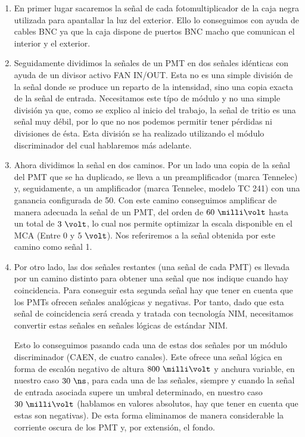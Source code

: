 \begin{enumerate} 
\item{} En primer lugar sacaremos la señal de cada fotomultiplicador de la caja negra utilizada para apantallar la luz del exterior. Ello lo conseguimos con ayuda de cables BNC  ya que la caja dispone de puertos BNC macho que comunican el interior y el exterior.

\item {} Seguidamente dividimos la señales de un PMT en dos señales idénticas con ayuda de un divisor activo FAN IN/OUT. Esta no es una simple división de la señal donde se produce un reparto de la intensidad, sino una copia exacta de la señal de entrada. Necesitamos este típo de módulo y no una simple división ya que, como se explico al inicio del trabajo, la señal de tritio es una señal muy débil, por lo que no nos podemos permitir tener pérdidas ni divisiones de ésta. Esta división se ha realizado utilizando el módulo discriminador del cual hablaremos más adelante.

\item {} Ahora dividimos la señal en dos caminos. Por un lado una copia de la señal del PMT que se ha duplicado, se lleva a un preamplificador (marca Tennelec) y, seguidamente, a un amplificador (marca Tennelec, modelo TC 241) con una ganancia configurada de 50. Con este camino conseguimos amplificar de manera adecuada la señal de un PMT, del orden de $60~\milli\volt$ hasta un total de $3~\volt$, lo cual nos permite optimizar la escala disponible en el MCA (Entre 0 y $5~\volt$). Nos referiremos a la señal obtenida por este camino como señal 1.

\item{} Por otro lado, las dos señales restantes (una señal de cada PMT) es llevada por un camino distinto para obtener una señal que nos indique cuando hay coincidencia. Para conseguir esta segunda señal hay que tener en cuenta que los PMTs ofrecen señales analógicas y negativas. Por tanto, dado que esta señal de coincidencia será creada y tratada con tecnología NIM, necesitamos convertir estas señales en señales lógicas de estándar NIM. 

Esto lo conseguimos pasando cada una de estas dos señales por un módulo discriminador (CAEN, de cuatro canales). Este ofrece una señal lógica en forma de escalón negativo de altura $800~\milli\volt$ y anchura variable, en nuestro caso $30~\ns$, para cada una de las señales, siempre y cuando la señal de entrada asociada supere un umbral determinado, en nuestro caso $30~\milli\volt$ (hablamos en valores absolutos, hay que tener en cuenta que estas son negativas). De esta forma eliminamos de manera considerable la corriente oscura de los PMT y, por extensión, el fondo.


\end{enumerate}

